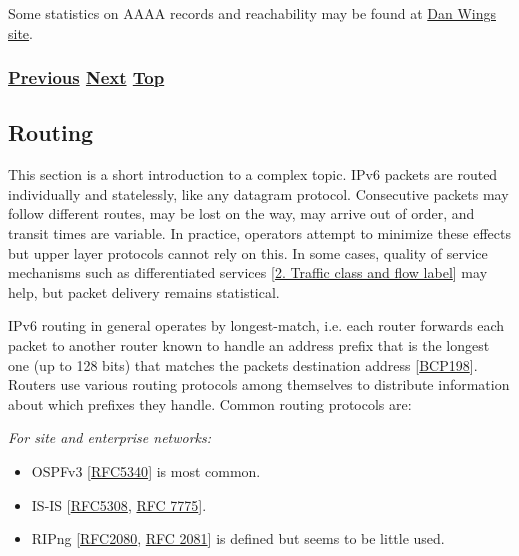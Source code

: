 \documentclass[
]{article}
\begin{document}
Some statistics on AAAA records and reachability may be found at
\href{https://www.employees.org/~dwing/aaaa-stats/}{Dan
Wing\textquotesingle s site}.

\subsubsection{\texorpdfstring{\hyperref[managed-configuration]{Previous}
\hyperref[routing]{Next}
\hyperref[ipv6-basic-technology]{Top}}{Previous Next Top}}\label{previous-next-top-13}

\pagebreak

\subsection{Routing}\label{routing}

This section is a short introduction to a complex topic. IPv6 packets
are routed individually and statelessly, like any datagram protocol.
Consecutive packets may follow different routes, may be lost on the way,
may arrive out of order, and transit times are variable. In practice,
operators attempt to minimize these effects but upper layer protocols
cannot rely on this. In some cases, quality of service mechanisms such
as differentiated services {[}\hyperref[traffic-class-and-flow-label]{2.
Traffic class and flow label}{]} may help, but packet delivery remains
statistical.

IPv6 routing in general operates by longest-match, i.e. each router
forwards each packet to another router known to handle an address prefix
that is the longest one (up to 128 bits) that matches the
packet\textquotesingle s destination address
{[}\href{https://www.rfc-editor.org/info/bcp198}{BCP198}{]}. Routers use
various routing protocols among themselves to distribute information
about which prefixes they handle. Common routing protocols are:

\emph{For site and enterprise networks:}

\begin{itemize}
\item
  OSPFv3 {[}\href{https://www.rfc-editor.org/info/rfc5340}{RFC5340}{]}
  is most common.
\item
  IS-IS {[}\href{https://www.rfc-editor.org/info/rfc5308}{RFC5308},
  \href{https://www.rfc-editor.org/info/rfc7775}{RFC 7775}{]}.
\item
  RIPng {[}\href{https://www.rfc-editor.org/info/rfc2080}{RFC2080},
  \href{https://www.rfc-editor.org/info/rfc2081}{RFC 2081}{]} is defined
  but seems to be little used.
\end{itemize}
\end{document}
